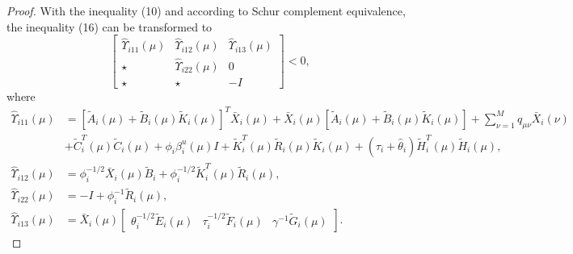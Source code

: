 \documentclass[11pt,draftcls,onecolumn]{IEEEtran}
\begin{document}
\begin{proof}
With the inequality (10)  and according to Schur complement equivalence, the inequality (16) can be transformed to
\begin{equation}
\left[
\begin{array}{cccc}
\hat{\Upsilon}_{i11}(\mu) & \hat{\Upsilon}_{i12}(\mu) & \hat{\Upsilon}_{i13}(\mu)\\
\star & \hat{\Upsilon}_{i22}(\mu) & 0   \\
\star & \star & -I
\end{array}
\right]<0,
\end{equation}
where
\begin{align*}
\hat{\Upsilon}_{i11}(\mu)&=\left[\tilde{A}_i(\mu)+\tilde{B}_i(\mu)\tilde{K}_i(\mu)\right]^T\bar{X}_i(\mu)+\bar{X}_i(\mu)
   \left[\tilde{A}_i(\mu)+\tilde{B}_i(\mu)\tilde{K}_i(\mu)\right]+\sum_{\nu=1}^Mq_{\mu\nu}\bar{X}_i(\nu)
   \\&+\tilde{C}_i^T(\mu)\tilde{C}_i(\mu)
   +\phi_i\beta_i^u(\mu)I+\tilde{K}_i^T(\mu)\tilde{R}_i(\mu)\tilde{K}_i(\mu)+(\tau_i+\hat{\theta}_i)\tilde{H}^T_i(\mu)\tilde{H}_i(\mu),\\
\hat{\Upsilon}_{i12}(\mu)&= \phi_i^{-1/2}\bar{X}_i(\mu)\tilde{B}_i+\phi_i^{-1/2}\tilde{K}_i^T(\mu)\tilde{R}_i(\mu),\\
\hat{\Upsilon}_{i22}(\mu)&= - I+\phi_i^{-1}\tilde{R}_i(\mu),\\
\hat{\Upsilon}_{i13}(\mu)&=\bar{X}_i(\mu)\begin{bmatrix}
\theta_i^{-1/2}\tilde{E}_i(\mu) & \tau_i^{-1/2}\tilde{F}_i(\mu) & \gamma^{-1}\tilde{G}_i(\mu)
\end{bmatrix}.
\end{align*}


\end{proof}
\end{document}
